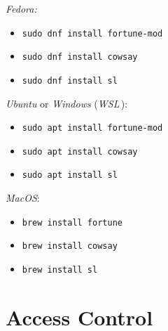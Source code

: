 \documentclass[english]{sheet}
\begin{document}
\begin{solution}
    \emph{Fedora:}
    \begin{itemize}
        \item \texttt{sudo dnf install fortune-mod}
        \item \texttt{sudo dnf install cowsay}
        \item \texttt{sudo dnf install sl}
    \end{itemize}
    \emph{Ubuntu} or \emph{Windows} (\emph{WSL}\,):
    \begin{itemize}
        \item \texttt{sudo apt install fortune-mod}
        \item \texttt{sudo apt install cowsay}
        \item \texttt{sudo apt install sl}
    \end{itemize}
    \emph{MacOS}:
    \begin{itemize}
        \item \texttt{brew install fortune}
        \item \texttt{brew install cowsay}
        \item \texttt{brew install sl}
    \end{itemize}
\end{solution}

\section{Access Control}
\end{document}
